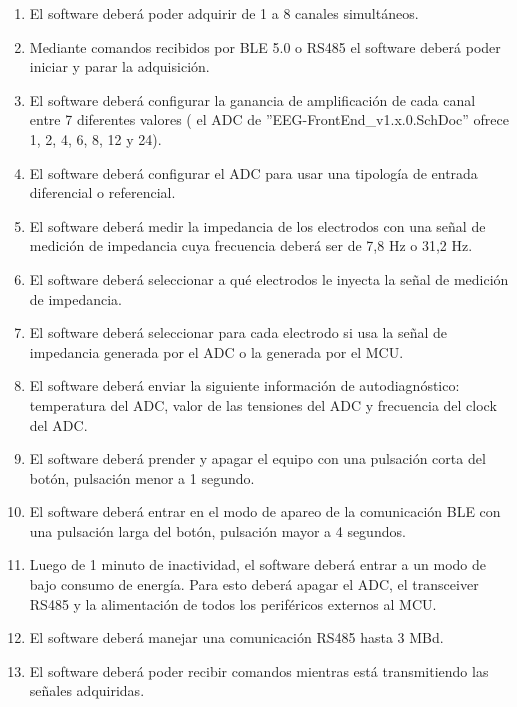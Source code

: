 \documentclass[
11pt, %
codirector, %
]{charter}
\begin{document}
\begin{enumerate}
\begin{enumerate}
			\item El software deberá poder adquirir de 1 a 8 canales simultáneos.
			\item Mediante comandos recibidos por BLE 5.0 o RS485 el software deberá poder iniciar y parar la adquisición.
			\item El software deberá configurar la ganancia de amplificación de cada canal entre 7 diferentes valores ( el ADC de ''EEG-FrontEnd\_v1.x.0.SchDoc” ofrece 1, 2, 4, 6, 8, 12 y 24).
			\item El software deberá configurar el ADC para usar una tipología de entrada diferencial o referencial.
			\item El software deberá medir la impedancia de los electrodos con una señal de medición de impedancia cuya frecuencia deberá ser de 7,8 Hz o 31,2 Hz.
			\item El software deberá seleccionar a qué electrodos le inyecta la señal de medición de impedancia.
			\item El software deberá seleccionar para cada electrodo si usa la señal de impedancia generada por el ADC o la generada por el MCU.
			\item El software deberá enviar la siguiente información de autodiagnóstico: temperatura del ADC, valor de las tensiones del ADC y frecuencia del clock del ADC.
			\item El software deberá prender y apagar el equipo con una pulsación corta del botón, pulsación menor a 1 segundo.
			\item El software deberá entrar en el modo de apareo de la comunicación BLE con una pulsación larga del botón, pulsación mayor a 4 segundos.
			\item Luego de 1 minuto de inactividad, el software deberá entrar a un modo de bajo consumo de energía. Para esto deberá apagar el ADC, el transceiver RS485 y la alimentación de todos los periféricos externos al MCU.
			\item El software deberá manejar una comunicación RS485 hasta 3 MBd.
			\item El software deberá poder recibir comandos mientras está transmitiendo las señales adquiridas.


\end{enumerate}
\end{enumerate}
\end{document}
